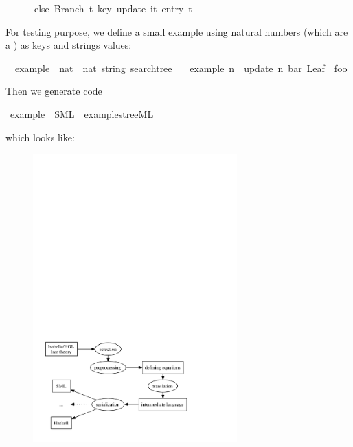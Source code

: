 \begin{isabellebody}
\ \ \ \ \ \ else\ {\isacharparenleft}Branch\ t{}\ key\ {\isacharparenleft}update\ {\isacharparenleft}it{\isacharcomma}\ entry{\isacharparenright}\ t{}{\isacharparenright}{\isacharparenright}\isanewline
\ \ \ {\isacharparenright}{\isachardoublequoteclose}%
\begin{isamarkuptext}%
\noindent For testing purpose, we define a small example
  using natural numbers  (which are a )
  as keys and strings values:%
\end{isamarkuptext}%
\isamarkuptrue%
\isamarkupfalse%
\isanewline
\ \ example\ {\isacharcolon}{\isacharcolon}\ {\isachardoublequoteopen}nat\ {\isasymRightarrow}\ {\isacharparenleft}nat{\isacharcomma}\ string{\isacharparenright}\ searchtree{\isachardoublequoteclose}\ \isanewline
\ \ {\isachardoublequoteopen}example\ n\ {\isacharequal}\ update\ {\isacharparenleft}n{\isacharcomma}\ {\isacharprime}{\isacharprime}bar{\isacharprime}{\isacharprime}{\isacharparenright}\ {\isacharparenleft}Leaf\ {}\ {\isacharprime}{\isacharprime}foo{\isacharprime}{\isacharprime}{\isacharparenright}{\isachardoublequoteclose}%
\begin{isamarkuptext}%
\noindent Then we generate code%
\end{isamarkuptext}%
\isamarkuptrue%
\isamarkupfalse%
\ example\ \ SML\ \ {\isachardoublequoteopen}examples{\isacharslash}tree{\isachardot}ML{\isachardoublequoteclose}%
\begin{isamarkuptext}%
\noindent which looks like:
\end{isamarkuptext}%
\isamarkuptrue%
%
\isamarkuptrue%
%
\begin{isamarkuptext}%
\begin{figure}[h]
  \centering
  \includegraphics[width=0.7\textwidth]{codegen_process}

\end{figure}
\end{isamarkuptext}
\end{isabellebody}
